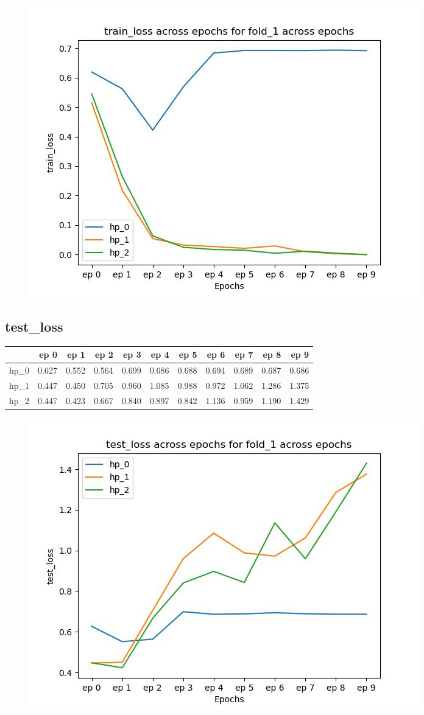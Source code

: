 \documentclass{article}
\begin{document}
\begin{figure}[H]
\includegraphics[scale = 0.75]{fold_1/train_loss}
\end{figure}
\subsection{test\_loss}
\begin{tabular}{lrrrrrrrrrr}
\toprule
{} &   ep 0 &   ep 1 &   ep 2 &   ep 3 &   ep 4 &   ep 5 &   ep 6 &   ep 7 &   ep 8 &   ep 9 \\
\midrule
hp\_0 &  0.627 &  0.552 &  0.564 &  0.699 &  0.686 &  0.688 &  0.694 &  0.689 &  0.687 &  0.686 \\
hp\_1 &  0.447 &  0.450 &  0.705 &  0.960 &  1.085 &  0.988 &  0.972 &  1.062 &  1.286 &  1.375 \\
hp\_2 &  0.447 &  0.423 &  0.667 &  0.840 &  0.897 &  0.842 &  1.136 &  0.959 &  1.190 &  1.429 \\
\bottomrule
\end{tabular}

\begin{figure}[H]
\includegraphics[scale = 0.75]{fold_1/test_loss}
\end{figure}
\end{document}
